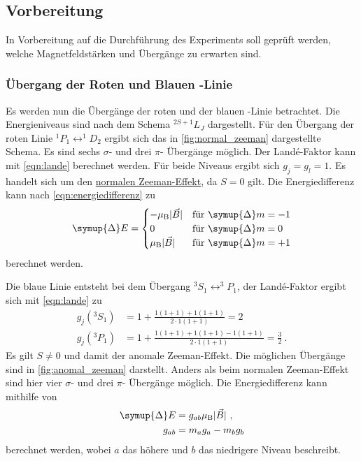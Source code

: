\subsection{Vorbereitung}

    In Vorbereitung auf die Durchführung des Experiments soll geprüft werden,
    welche Magnetfeldstärken und Übergänge zu erwarten sind.


\subsubsection{Übergang der Roten und Blauen -Linie}
\label{sec:vorb_uebergaenge}

    Es werden nun die Übergänge der roten und der blauen -Linie betrachtet.
    Die Energieniveaus sind nach dem Schema $^{2S+1}L_J$ dargestellt.
    Für den Übergang der roten Linie $^1P_1 \leftrightarrow ^1D_2$ ergibt sich
    das in \autoref{fig:normal_zeeman} dargestellte Schema.
    Es sind sechs $\sigma$- und drei $\pi$- Übergänge möglich.
    Der Landé-Faktor kann mit \autoref{eqn:lande} berechnet werden.
    Für beide Niveaus ergibt sich $g_j = g_l = 1$.
    Es handelt sich um den \hyperref[sec:theorie:zeeman:normal]{normalen Zeeman-Effekt},
    da $S = 0$ gilt.
    Die Energiedifferenz kann nach \autoref{eqn:energiedifferenz} zu
    \begin{equation*}
        \symup{\Delta} E =
        \begin{cases}
            - \mu_\text{B} \lvert \vec{B} \rvert & \text{für } \symup{\Delta} m = -1 \\
            0 & \text{für } \symup{\Delta} m = 0 \\
            \mu_\text{B} \lvert \vec{B} \rvert & \text{für } \symup{\Delta} m = +1
        \end{cases}
    \end{equation*}
    berechnet werden.


    Die blaue Linie entsteht bei dem Übergang $^3S_1 \leftrightarrow ^3P_1$,
    der Landé-Faktor ergibt sich mit \autoref{eqn:lande} zu
    \begin{align*}
        g_j(^3S_1) &= 1 + \frac{1(1+1)+1(1+1)}{2 \cdot 1(1+1)} = 2 \\
        g_j(^3P_1) &= 1 + \frac{1(1+1)+1(1+1)-1(1+1)}{2 \cdot 1(1+1)} = \frac{3}{2} \ .
    \end{align*}
    Es gilt $S \neq 0$ und damit der anomale Zeeman-Effekt.
    Die möglichen Übergänge sind in \autoref{fig:anomal_zeeman} darstellt.
    Anders als beim normalen Zeeman-Effekt
    sind hier vier $\sigma$- und drei $\pi$- Übergänge möglich.
    Die Energiedifferenz kann mithilfe von
    \begin{align}
        \symup{\Delta} E &= g_{ab} \mu_\text{B} \lvert \vec{B} \rvert \ ,
        \label{eqn:energiedifferenz_anomal}\\
        g_{ab} &= m_a g_a - m_b g_b
        \label{eqn:lande_anomal}
    \end{align}
    berechnet werden,
    wobei $a$ das höhere und $b$ das niedrigere Niveau beschreibt.

